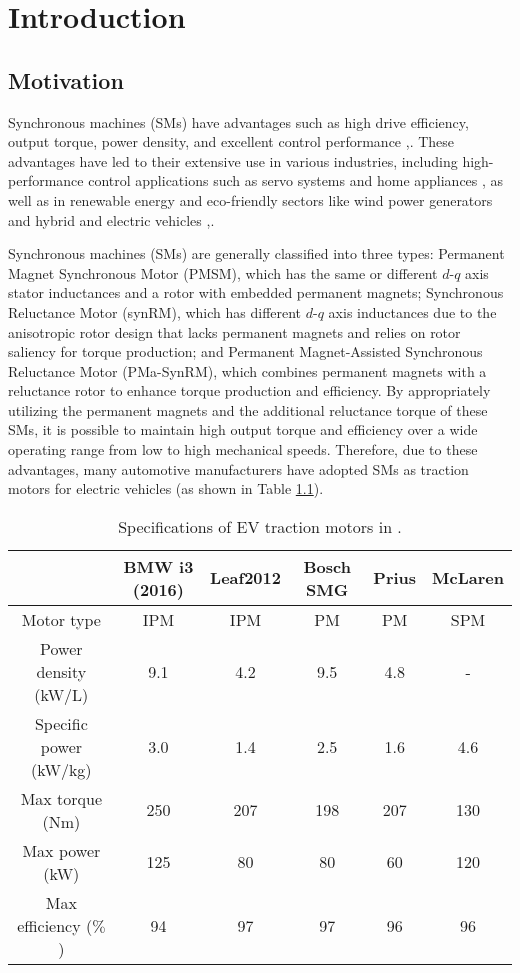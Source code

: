 

\chapter{Introduction}\label{chapter1}
\section{Motivation} \label{chap1:sec1}

Synchronous machines (SMs) have advantages such as high drive efficiency, output torque, power density, and excellent control performance \cite{c1_5},\cite{c2.1_1}. These advantages have led to their extensive use in various industries, including high-performance control applications such as servo systems \cite{c1_3} and home appliances \cite{c1_6}, as well as in renewable energy and eco-friendly sectors like wind power generators \cite{c1_4} and hybrid and electric vehicles \cite{c1_7},\cite{c1_8}.

Synchronous machines (SMs) are generally classified into three types: Permanent Magnet Synchronous Motor (PMSM), which has the same or different $d$-$q$ axis stator inductances and a rotor with embedded permanent magnets; Synchronous Reluctance Motor (synRM), which has different $d$-$q$ axis inductances due to the anisotropic rotor design that lacks permanent magnets and relies on rotor saliency for torque production; and Permanent Magnet-Assisted Synchronous Reluctance Motor (PMa-SynRM), which combines permanent magnets with a reluctance rotor to enhance torque production and efficiency. By appropriately utilizing the permanent magnets and the additional reluctance torque of these SMs, it is possible to maintain high output torque and efficiency over a wide operating range from low to high mechanical speeds. Therefore, due to these advantages, many automotive manufacturers have adopted SMs as traction motors for electric vehicles \cite{c1_7} (as shown in Table \ref{Table:1.1}).

\begin{table}[t]
\centering
\begin{tabular}{c|c|c|c|c|c}
\toprule
\hline
 & BMW i3 (2016) & Leaf2012 & Bosch SMG & Prius & McLaren\\
\hline
Motor type & IPM & IPM & PM & PM & SPM\\
\hline
Power density (kW/L) & 9.1 & 4.2 & 9.5 & 4.8 & -\\
\hline
Specific power (kW/kg) & 3.0 & 1.4 & 2.5 & 1.6 & 4.6\\
\hline
Max torque (Nm) & 250 & 207 & 198 & 207 & 130 \\
\hline
Max power (kW) & 125 & 80 & 80 & 60 & 120 \\
\hline
Max efficiency ($\%$) & 94 & 97 & 97 & 96 & 96 \\ 
\hline
\bottomrule
\end{tabular}
\caption{Specifications of EV traction motors in \cite{c1_7}.}
\label{Table:1.1}
\end{table}

